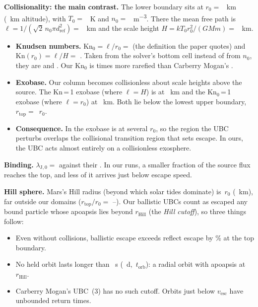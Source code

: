 \documentclass[10pt]{article}
\newcommand{\para}[1]{\textbf{#1}\hspace{0.5em}}
\newcommand{\minv}{m\textsuperscript{−3}}
\newcommand{\torb}{t_\mathrm{orb}}
\newcommand{\rtop}{r_\mathrm{top}}
\newcommand{\rhill}{r_\mathrm{Hill}}
\begin{document}
\para{Collisionality: the main contrast.} The lower boundary sits at $r_0 = $ \oRzero{}~km (\oZzero{}~km altitude), with $T_0 = $ \oTzero{}~K and $n_0 = $ \oNzero{}~\minv{}. There the mean free path is $\ell = 1/(\sqrt2\, n_0 \pi d_\mathrm{ref}^2) = $ \oMfpZero{}~km and the scale height $H = kT_0 r_0^2/(GMm) = $ \oScaleHZero{}~km.
\begin{itemize}
  \item \textbf{Knudsen numbers.} $\mathrm{Kn}_0 = \ell/r_0 = $ \oKnZero{} (the definition the paper quotes) and $\mathrm{Kn}(r_0) = \ell/H = $ \oKnH{}. Taken from the solver's bottom cell instead of from $n_0$, they are \oKnZeroBottom{} and \oKnBottom{}. Our $\mathrm{Kn}_0$ is \oKnRatio{} times more rarefied than Carberry Mogan's \pKnZero{}.
  \item \textbf{Exobase.} Our column becomes collisionless about \exoKnHeightH{} scale heights above the source. The Kn\,=\,1 exobase (where $\ell = H$) is at \exoZReflectKn{}~km and the $\mathrm{Kn}_0$\,=\,1 exobase (where $\ell = r_0$) at \exoZReflectKnZero{}~km. Both lie below the lowest upper boundary, $\rtop = $ \oRtopLo{}\,$r_0$.
  \item \textbf{Consequence.} In \citet{cm21} the exobase is at several $r_0$, so the region the UBC perturbs overlaps the collisional transition region that sets escape. In ours, the UBC acts almost entirely on a collisionless exosphere.
\end{itemize}

\para{Binding.} $\lambda_{\mathrm{J},0} = $ \oLambdaZero{} against their \pLambdaZero{}. In our runs, a smaller fraction of the source flux reaches the top, and less of it arrives just below escape speed.

\para{Hill sphere.} Mars's Hill radius (beyond which solar tides dominate) is \oHill{}\,$r_0$ (\oHillKm{}~km), far outside our domains ($\rtop/r_0 = $ \oRtopLo{}–\oRtopHi{}). Our ballistic UBCs count as escaped any bound particle whose apoapsis lies beyond $\rhill$ (the \emph{Hill cutoff}), so three things follow:
\begin{itemize}
  \item Even without collisions, ballistic escape exceeds reflect escape by \anBallisticExcess{}\% at the top boundary.
  \item No held orbit lasts longer than \tReturnMax{}~s (\tReturnMaxDays{}~d, \tReturnMaxOrb{}\,$\torb$): a radial orbit with apoapsis at $\rhill$.
  \item Carberry Mogan's UBC~(3) has no such cutoff. Orbits just below $v_\mathrm{esc}$ have unbounded return times.
\end{itemize}
\end{document}
